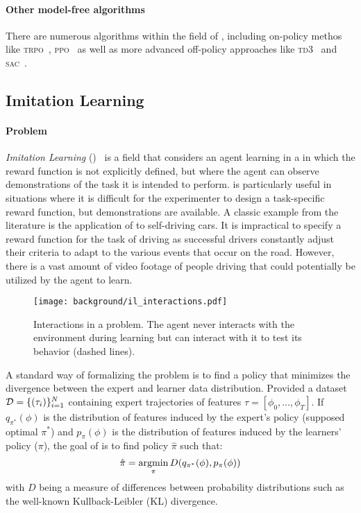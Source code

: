 \paragraph{Other model-free \rl algorithms}

There are numerous algorithms within the field of \drl, including on-policy methos like \textsc{trpo}~\citep{pmlr-v37-schulman15}, \textsc{ppo}~\citep{ppo2017} as well as more advanced off-policy approaches like \textsc{td3}~\citep{pmlr-v80-fujimoto18a} and \textsc{sac}~\citep{pmlr-v80-haarnoja18b}.


\subsection{Imitation Learning}

\paragraph{Problem}

\textit{Imitation Learning} (\il)~\citep{pommerleau1988BC,schaal1996learning,osa2018algorithmic} is a field that considers an agent learning in a \mdp in which the reward function is not explicitly defined, but where the agent can observe demonstrations of the task it is intended to perform. \il is particularly useful in situations where it is difficult for the experimenter to design a task-specific reward function, but demonstrations are available. A classic example from the literature is the application of \il to self-driving cars. It is impractical to specify a reward function for the task of driving as successful drivers constantly adjust their criteria to adapt to the various events that occur on the road. However, there is a vast amount of video footage of people driving that could potentially be utilized by the agent to learn.

\begin{figure}[!h]
\centering
\texttt{[image: background/il\_interactions.pdf]}	
\caption{Interactions in a \il problem. The agent never interacts with the environment during learning but can interact with it to test its behavior (dashed lines).}
\label{fig:il_interacvtions}
\end{figure}

A standard way of formalizing the \il problem is to find a policy that minimizes the divergence between the expert and learner data distribution. Provided a dataset $\mathcal{D}=\{(\tau_i)\}_{i=1}^N$ containing expert trajectories of features $\tau = [\phi_0,\dots, \phi_T]$. If $q_{\pi^*}(\phi)$ is the distribution of features induced by the expert's policy (supposed optimal $\pi^*$) and $p_\pi(\phi)$ is the distribution of features induced by the learners' policy ($\pi$), the goal of \il is to find policy $\hat{\pi}$ such that:
\begin{equation}
\hat{\pi} = \operatorname*{argmin}_{\pi}D(q_{\pi^*}(\phi),p_\pi(\phi))
\end{equation}
with $D$ being a measure of differences between probability distributions such as the well-known Kullback-Leibler (KL) divergence.

